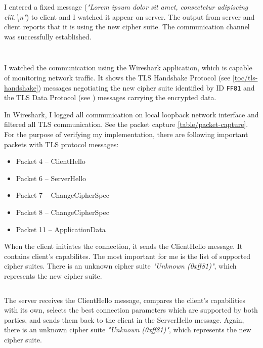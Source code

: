 I entered a fixed message (\textit{"Lorem ipsum dolor sit amet, consectetur adipiscing elit.\textbackslash{}n"}) to client and I watched it appear on server. The output from server and client reports that it is using the new cipher suite. The communication channel was successfully established.

\inputminted{text}{code/caesar-s_client.txt}
\inputminted{text}{code/caesar-s_server.txt}

I watched the communication using the Wireshark application, which is capable of monitoring network traffic. It shows the TLS Handshake Protocol (see \autoref{toc/tls-handshake}) messages negotiating the new cipher suite identified by ID \texttt{FF81} and the TLS Data Protocol (see ) messages carrying the encrypted data.

In Wireshark, I logged all communication on local loopback network interface and filtered all TLS communication. See the packet capture \autoref{table/packet-capture}. For the purpose of verifying my implementation, there are following important packets with TLS protocol messages:



\begin{itemize}
  \item Packet 4 -- ClientHello
  \item Packet 6 -- ServerHello
  \item Packet 7 -- ChangeCipherSpec
  \item Packet 8 -- ChangeCipherSpec
  \item Packet 11 -- ApplicationData
\end{itemize}

When the client initiates the connection, it sends the ClientHello message. It contains client's capabilites. The most important for me is the list of supported cipher suites. There is an unknown cipher suite \textit{"Unknown (0xff81)"}, which represents the new cipher suite.

\inputminted{text}{code/packet-client-hello.txt}

The server receives the ClientHello message, compares the client's capabilities with its own, selects the best connection parameters which are supported by both parties, and sends them back to the client in the ServerHello message. Again, there is an unknown cipher suite \textit{"Unknown (0xff81)"}, which represents the new cipher suite.

\inputminted{text}{code/packet-server-hello.txt}

